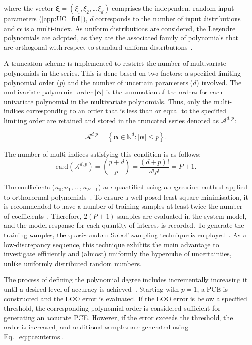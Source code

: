 \documentclass[11pt,twoside,a4paper,english]{article}
\begin{document}
where the vector $\bm{\xi} = (\xi_1,\xi_2, \dots \xi_d)$ comprises the independent random input parameters (\autoref{app:UC_full}), $d$ corresponds to the number of input distributions and $\bm{\alpha}$ is a multi-index. As uniform distributions are considered, the Legendre polynomials are adopted, as they are the associated family of polynomials that are orthogonal with respect to standard uniform distributions~\cite{Sudret2014}.\par 

A truncation scheme is implemented to restrict the number of multivariate polynomials in the series. This is done based on two factors: a specified limiting polynomial order ($p$) and the number of uncertain parameters ($d$) involved. The multivariate polynomial order $|\bm{\alpha}|$ is the summation of the orders for each univariate polynomial in the multivariate polynomials. Thus, only the multi-indices corresponding to an order that is less than or equal to the specified limiting order are retained and stored in the truncated series denoted as $\mathcal{A}^{d,p}$:

\begin{equation}
\mathcal{A}^{d,p} = \left \{ \bm{\alpha} \in \mathbb{N}^d : |\bm{\alpha}| \leq p \right \}. 
\end{equation}

The number of multi-indices satisfying this condition is as follows:
\begin{equation}
\mathrm{card} \left( \mathcal{A}^{d,p} \right) = {p + d \choose p} = \dfrac{\left( d + p \right) !}{d! p!} = P + 1.
\label{eq:pce:nterms}
\end{equation}

The coefficients ($u_0, u_1, \dots, u_{P+1}$) are quantified using a regression method applied to orthonormal polynomials~\cite{Sudret2014}. To ensure a well-posed least-square minimisation, it is recommended to have a number of training samples at least twice the number of coefficients~\cite{Sudret2014}. Therefore, $2 \left( P+1 \right)$ samples are evaluated in the system model, and the model response for each quantity of interest is recorded. To generate the training samples, the quasi-random Sobol' sampling technique is employed~\cite{bratley2003implementing}. As a low-discrepancy sequence, this technique exhibits the main advantage to investigate efficiently and (almost) uniformly the hypercube of uncertainties, unlike uniformly distributed random numbers.\par

The process of defining the polynomial degree includes incrementally increasing it until a desired level of accuracy is achieved~\cite{coppitters2022rheia}. Starting with $p=1$, a PCE is constructed and the \gls{LOO} error is evaluated. If the \gls{LOO} error is below a specified threshold, the corresponding polynomial order is considered sufficient for generating an accurate PCE. However, if the error exceeds the threshold, the order is increased, and additional samples are generated using Eq.~\ref{eq:pce:nterms}.
\end{document}
